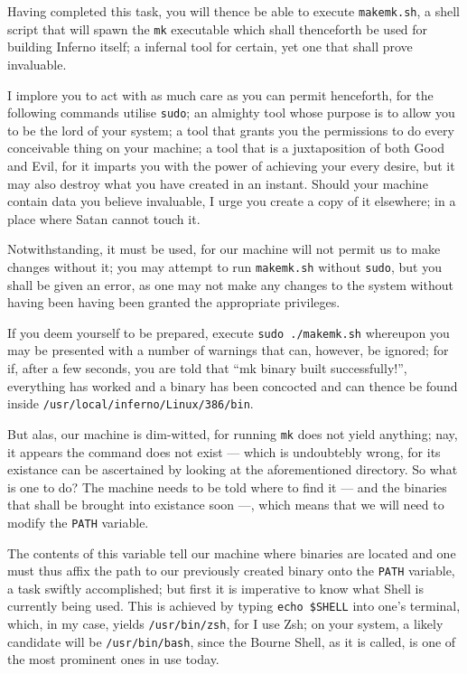 \documentclass[a4paper,12pt]{report}
\begin{document}
  Having completed this task, you will thence be able to execute \texttt{makemk.sh}, a shell script that will spawn the \texttt{mk} executable which shall thenceforth be used for building Inferno itself; a infernal tool for certain, yet one that shall prove invaluable.

  I implore you to act with as much care as you can permit henceforth, for the following commands utilise \texttt{sudo}; an almighty tool whose purpose is to allow you to be the lord of your system; a tool that grants you the permissions to do every conceivable thing on your machine; a tool that is a juxtaposition of both Good and Evil, for it imparts you with the power of achieving your every desire, but it may also destroy what you have created in an instant. Should your machine contain data you believe invaluable, I urge you create a copy of it elsewhere; in a place where Satan cannot touch it.

  Notwithstanding, it must be used, for our machine will not permit us to make changes without it; you may attempt to run \texttt{makemk.sh} without \texttt{sudo}, but you shall be given an error, as one may not make any changes to the system without having been having been granted the appropriate privileges.

  If you deem yourself to be prepared, execute \texttt{sudo ./makemk.sh} whereupon you may be presented with a number of warnings that can, however, be ignored; for if, after a few seconds, you are told that ``mk binary built successfully!'', everything has worked and a binary has been concocted and can thence be found inside \texttt{/usr/local/inferno/Linux/386/bin}.

  But alas, our machine is dim-witted, for running \texttt{mk} does not yield anything; nay, it appears the command does not exist — which is undoubtebly wrong, for its existance can be ascertained by looking at the aforementioned directory. So what is one to do? The machine needs to be told where to find it — and the binaries that shall be brought into existance soon —, which means that we will need to modify the \texttt{PATH} variable.

  The contents of this variable tell our machine where binaries are located and one must thus affix the path to our previously created binary onto the \texttt{PATH} variable, a task swiftly accomplished; but first it is imperative to know what Shell is currently being used. This is achieved by typing \texttt{echo \$SHELL} into one's terminal, which, in my case, yields \texttt{/usr/bin/zsh}, for I use Zsh; on your system, a likely candidate will be \texttt{/usr/bin/bash}, since the Bourne Shell, as it is called, is one of the most prominent ones in use today.
\end{document}
